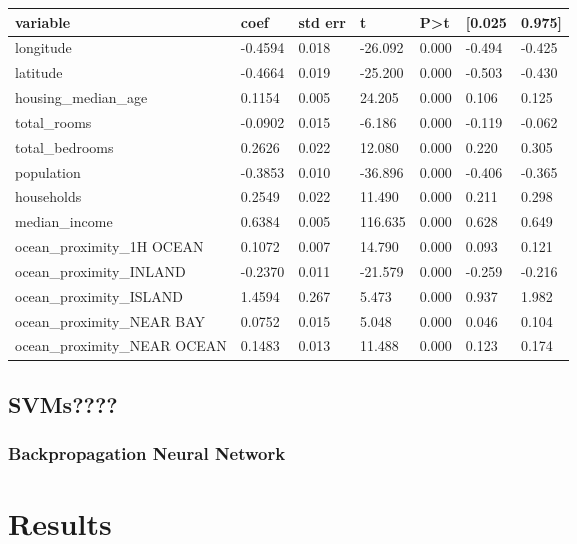 \documentclass[11pt]{article}
\begin{document}
\begin{table}[H]
\centering
\begin{tabular}{|l|l|l|l|l|l|l|} 
\hline
\textbf{variable} & \textbf{coef} & \textbf{std err} & \textbf{t} & \textbf{P\textgreater{}\textbar{}t\textbar{}} & \textbf{[0.025} & \textbf{0.975]} \\ 
\hline
longitude & -0.4594 & 0.018 & -26.092 & 0.000 & -0.494 & -0.425 \\ 
\hline
latitude & -0.4664 & 0.019 & -25.200 & 0.000 & -0.503 & -0.430 \\ 
\hline
housing\_median\_age & 0.1154 & 0.005 & 24.205 & 0.000 & 0.106 & 0.125 \\ 
\hline
total\_rooms & -0.0902 & 0.015 & -6.186 & 0.000 & -0.119 & -0.062 \\ 
\hline
total\_bedrooms & 0.2626 & 0.022 & 12.080 & 0.000 & 0.220 & 0.305 \\ 
\hline
population & -0.3853 & 0.010 & -36.896 & 0.000 & -0.406 & -0.365 \\ 
\hline
households & 0.2549 & 0.022 & 11.490 & 0.000 & 0.211 & 0.298 \\ 
\hline
median\_income & 0.6384 & 0.005 & 116.635 & 0.000 & 0.628 & 0.649 \\ 
\hline
ocean\_proximity\_1H OCEAN & 0.1072 & 0.007 & 14.790 & 0.000 & 0.093 & 0.121 \\ 
\hline
ocean\_proximity\_INLAND & -0.2370 & 0.011 & -21.579 & 0.000 & -0.259 & -0.216 \\ 
\hline
ocean\_proximity\_ISLAND & 1.4594 & 0.267 & 5.473 & 0.000 & 0.937 & 1.982 \\ 
\hline
ocean\_proximity\_NEAR BAY & 0.0752 & 0.015 & 5.048 & 0.000 & 0.046 & 0.104 \\ 
\hline
ocean\_proximity\_NEAR OCEAN & 0.1483 & 0.013 & 11.488 & 0.000 & 0.123 & 0.174 \\
\hline
\end{tabular}
\end{table}

\subsection{SVMs????}

\subsubsection{Backpropagation Neural Network}

\section{Results}
\end{document}
